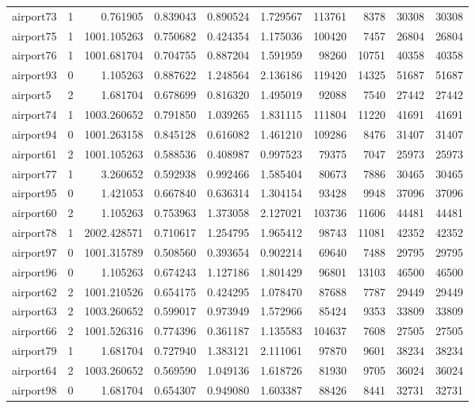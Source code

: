 \documentclass[../../../thesis.tex]{subfiles}
\begin{document}
\begin{longtable}{|l|r|r|r|r|r|r|r|r|r|}
airport73 & 1 & 0.761905 & 0.839043 & 0.890524 & 1.729567 & 113761 & 8378 & 30308 & 30308 \\
airport75 & 1 & 1001.105263 & 0.750682 & 0.424354 & 1.175036 & 100420 & 7457 & 26804 & 26804 \\
airport76 & 1 & 1001.681704 & 0.704755 & 0.887204 & 1.591959 & 98260 & 10751 & 40358 & 40358 \\
airport93 & 0 & 1.105263 & 0.887622 & 1.248564 & 2.136186 & 119420 & 14325 & 51687 & 51687 \\
airport5 & 2 & 1.681704 & 0.678699 & 0.816320 & 1.495019 & 92088 & 7540 & 27442 & 27442 \\
airport74 & 1 & 1003.260652 & 0.791850 & 1.039265 & 1.831115 & 111804 & 11220 & 41691 & 41691 \\
airport94 & 0 & 1001.263158 & 0.845128 & 0.616082 & 1.461210 & 109286 & 8476 & 31407 & 31407 \\
airport61 & 2 & 1001.105263 & 0.588536 & 0.408987 & 0.997523 & 79375 & 7047 & 25973 & 25973 \\
airport77 & 1 & 3.260652 & 0.592938 & 0.992466 & 1.585404 & 80673 & 7886 & 30465 & 30465 \\
airport95 & 0 & 1.421053 & 0.667840 & 0.636314 & 1.304154 & 93428 & 9948 & 37096 & 37096 \\
airport60 & 2 & 1.105263 & 0.753963 & 1.373058 & 2.127021 & 103736 & 11606 & 44481 & 44481 \\
airport78 & 1 & 2002.428571 & 0.710617 & 1.254795 & 1.965412 & 98743 & 11081 & 42352 & 42352 \\
airport97 & 0 & 1001.315789 & 0.508560 & 0.393654 & 0.902214 & 69640 & 7488 & 29795 & 29795 \\
airport96 & 0 & 1.105263 & 0.674243 & 1.127186 & 1.801429 & 96801 & 13103 & 46500 & 46500 \\
airport62 & 2 & 1001.210526 & 0.654175 & 0.424295 & 1.078470 & 87688 & 7787 & 29449 & 29449 \\
airport63 & 2 & 1003.260652 & 0.599017 & 0.973949 & 1.572966 & 85424 & 9353 & 33809 & 33809 \\
airport66 & 2 & 1001.526316 & 0.774396 & 0.361187 & 1.135583 & 104637 & 7608 & 27505 & 27505 \\
airport79 & 1 & 1.681704 & 0.727940 & 1.383121 & 2.111061 & 97870 & 9601 & 38234 & 38234 \\
airport64 & 2 & 1003.260652 & 0.569590 & 1.049136 & 1.618726 & 81930 & 9705 & 36024 & 36024 \\
airport98 & 0 & 1.681704 & 0.654307 & 0.949080 & 1.603387 & 88426 & 8441 & 32731 & 32731 \\

\end{longtable}
\end{document}
